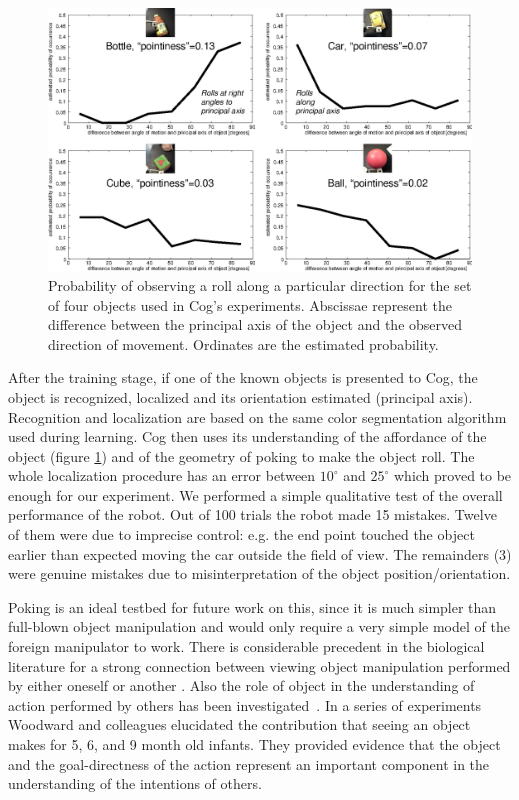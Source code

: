 %
%
\begin{figure}[tb]
\begin{center}
\includegraphics[width=\columnwidth]{affordances.eps}
\caption{ 
\label{fig:affordances}
%
%
Probability of observing a roll along a particular direction for the set of
four objects used in Cog's experiments. Abscissae represent the difference
between the principal axis of the object and the observed direction of movement.
Ordinates are the estimated probability.
}
\end{center}
\end{figure}
%
%

After the training stage, if one of the known objects is presented to Cog, the 
object is recognized, localized and its orientation estimated (principal 
axis). Recognition and localization are based on the same color 
segmentation algorithm used during learning. Cog then uses its 
understanding of the affordance of the object (figure \ref{fig:affordances}) 
and of the geometry of poking to make the object roll. The whole localization 
procedure has an error between $10^{\circ}$ and $25^{\circ}$ which proved 
to be enough for our experiment. We performed a simple qualitative test of 
the overall performance of the robot. Out of 100 trials the robot made 15 
mistakes. Twelve of them were due to imprecise control: e.g. the end point 
touched the object earlier than expected moving the car outside the field of 
view. The remainders (3) were genuine mistakes due to misinterpretation of 
the object position/orientation.






\ifverbose
Poking is an ideal testbed for future work on this, since it is much
simpler than full-blown object manipulation and would only require a
very simple model of the foreign manipulator to work.
There is considerable precedent in the biological literature for a
strong connection between viewing object manipulation performed by
either oneself or another \cite{wohlsclager02human}. Also
the role of object in the understanding of action performed by others
has been investigated~\cite{woodward98infants}. In a series of
experiments Woodward and colleagues elucidated the contribution that
seeing an object makes for 5, 6, and 9 month old infants. They
provided evidence that the object and the goal-directness of the
action represent an important component in the understanding of the
intentions of others.
\fi

